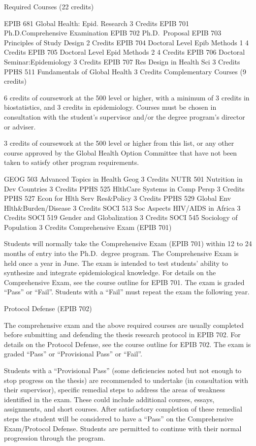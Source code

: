 \documentclass[
]{book}
\begin{document}
Required Courses (22 credits)

EPIB 681 Global Health: Epid. Research 3 Credits
EPIB 701 Ph.D.Comprehensive Examination
EPIB 702 Ph.D.~Proposal
EPIB 703 Principles of Study Design 2 Credits
EPIB 704 Doctoral Level Epib Methods 1 4 Credits
EPIB 705 Doctoral Level Epid Methods 2 4 Credits
EPIB 706 Doctoral Seminar:Epidemiology 3 Credits
EPIB 707 Res Design in Health Sci 3 Credits
PPHS 511 Fundamentals of Global Health 3 Credits
Complementary Courses (9 credits)

6 credits of coursework at the 500 level or higher, with a minimum of 3 credits in biostatistics, and 3 credits in epidemiology. Courses must be chosen in consultation with the student's supervisor and/or the degree program's director or adviser.

3 credits of coursework at the 500 level or higher from this list, or any other course approved by the Global Health Option Committee that have not been taken to satisfy other program requirements.

GEOG 503 Advanced Topics in Health Geog 3 Credits
NUTR 501 Nutrition in Dev Countries 3 Credits
PPHS 525 HlthCare Systems in Comp Persp 3 Credits
PPHS 527 Econ for Hlth Serv Res\&Policy 3 Credits
PPHS 529 Global Env Hlth\&Burden/Disease 3 Credits
SOCI 513 Soc Aspects HIV/AIDS in Africa 3 Credits
SOCI 519 Gender and Globalization 3 Credits
SOCI 545 Sociology of Population 3 Credits
Comprehensive Exam (EPIB 701)

Students will normally take the Comprehensive Exam (EPIB 701) within 12 to 24 months of entry into the Ph.D.~degree program. The Comprehensive Exam is held once a year in June. The exam is intended to test students' ability to synthesize and integrate epidemiological knowledge. For details on the Comprehensive Exam, see the course outline for EPIB 701. The exam is graded ``Pass'' or ``Fail''. Students with a ``Fail'' must repeat the exam the following year.

Protocol Defense (EPIB 702)

The comprehensive exam and the above required courses are usually completed before submitting and defending the thesis research protocol in EPIB 702. For details on the Protocol Defense, see the course outline for EPIB 702. The exam is graded ``Pass'' or ``Provisional Pass'' or ``Fail''.

Students with a ``Provisional Pass'' (some deficiencies noted but not enough to stop progress on the thesis) are recommended to undertake (in consultation with their supervisor), specific remedial steps to address the areas of weakness identified in the exam. These could include additional courses, essays, assignments, and short courses. After satisfactory completion of these remedial steps the student will be considered to have a ``Pass'' on the Comprehensive Exam/Protocol Defense. Students are permitted to continue with their normal progression through the program.
\end{document}
